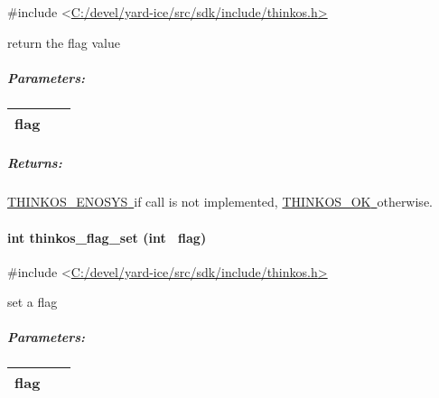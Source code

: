 {{}

{\#include
\textless{}}{\protect\hyperlink{h.pkwqa1}{C:/devel/yard-ice/src/sdk/include/thinkos.h}}{\protect\hyperlink{h.pkwqa1}{\textgreater{}}}

{return the flag value }

{}

\subparagraph{\texorpdfstring{{Parameters:}}{Parameters:}}\label{parameters-34}

\protect\hypertarget{t.383f7e723be615a1ab251cbb171dc44f8c48c9f4}{}{}\protect\hypertarget{t.34}{}{}

\begin{longtable}[]{@{}ll@{}}
\toprule
\begin{minipage}[t]{0.47\columnwidth}\raggedright\strut
{flag}{~}\strut
\end{minipage} & \begin{minipage}[t]{0.47\columnwidth}\raggedright\strut
{}\strut
\end{minipage}\tabularnewline
\bottomrule
\end{longtable}

\subparagraph{\texorpdfstring{{Returns:}}{Returns:}}\label{returns-38}

{\protect\hyperlink{h.3s49zyc}{THINKOS\_ENOSYS}}{\protect\hyperlink{h.3s49zyc}{~}}{if
call is not implemented,
}{\protect\hyperlink{h.2fk6b3p}{THINKOS\_OK}}{\protect\hyperlink{h.2fk6b3p}{~}}{otherwise.
}

\paragraph{\texorpdfstring{{int thinkos\_flag\_set (int
~flag)}}{int thinkos\_flag\_set (int ~flag)}}\label{int-thinkos_flag_set-int-flag}

{}

{\#include
\textless{}}{\protect\hyperlink{h.pkwqa1}{C:/devel/yard-ice/src/sdk/include/thinkos.h}}{\protect\hyperlink{h.pkwqa1}{\textgreater{}}}

{set a flag }

{}

\subparagraph{\texorpdfstring{{Parameters:}}{Parameters:}}\label{parameters-35}

\protect\hypertarget{t.383f7e723be615a1ab251cbb171dc44f8c48c9f4}{}{}\protect\hypertarget{t.35}{}{}

\begin{longtable}[]{@{}ll@{}}
\toprule
\begin{minipage}[t]{0.47\columnwidth}\raggedright\strut
{flag}{~}\strut
\end{minipage} & \begin{minipage}[t]{0.47\columnwidth}\raggedright\strut
{}\strut
\end{minipage}\tabularnewline
\bottomrule
\end{longtable}

}
